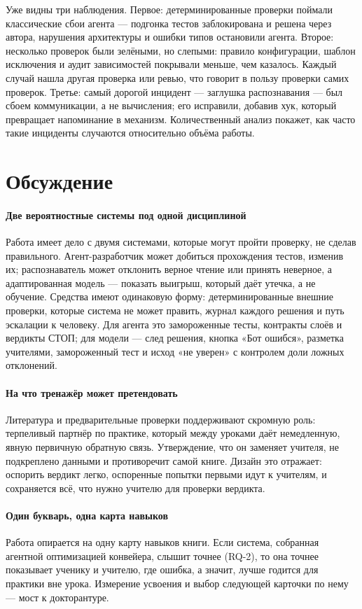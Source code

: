 Уже видны три наблюдения. Первое: детерминированные проверки поймали классические сбои агента ---
подгонка тестов заблокирована и решена через автора, нарушения архитектуры и ошибки типов остановили
агента. Второе: несколько проверок были зелёными, но слепыми: правило конфигурации, шаблон исключения и
аудит зависимостей покрывали меньше, чем казалось. Каждый случай нашла другая проверка или ревью, что
говорит в пользу проверки самих проверок. Третье: самый дорогой инцидент --- заглушка распознавания --- был
сбоем коммуникации, а не вычисления; его исправили, добавив хук, который превращает напоминание в
механизм. Количественный анализ покажет, как часто такие инциденты случаются относительно объёма работы.

\section{Обсуждение}\label{sec:eval-discussion}

\paragraph{Две вероятностные системы под одной дисциплиной} Работа имеет дело с двумя системами, которые
могут пройти проверку, не сделав правильного. Агент-разработчик может добиться прохождения тестов, изменив
их; распознаватель может отклонить верное чтение или принять неверное, а адаптированная модель ---
показать выигрыш, который даёт утечка, а не обучение. Средства имеют одинаковую форму: детерминированные
внешние проверки, которые система не может править, журнал каждого решения и путь эскалации к человеку.
Для агента это замороженные тесты, контракты слоёв и вердикты СТОП; для модели --- след решения, кнопка
«Бот ошибся», разметка учителями, замороженный тест и исход «не уверен» с контролем
доли ложных отклонений.

\paragraph{На что тренажёр может претендовать} Литература и предварительные проверки поддерживают скромную
роль: терпеливый партнёр по практике, который между уроками даёт немедленную, явную первичную обратную
связь. Утверждение, что он заменяет учителя, не подкреплено данными и противоречит самой книге. Дизайн это
отражает: оспорить вердикт легко, оспоренные попытки первыми идут к учителям, и сохраняется всё, что нужно
учителю для проверки вердикта.

\paragraph{Один букварь, одна карта навыков} Работа опирается на одну карту навыков книги.
Если система, собранная агентной оптимизацией конвейера, слышит точнее (RQ-2), то она точнее показывает ученику и учителю, где ошибка, а значит, лучше годится для практики вне урока. Измерение усвоения и выбор следующей карточки по нему --- мост к докторантуре.

